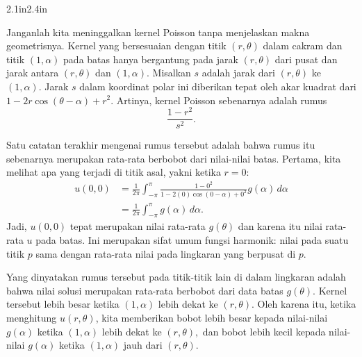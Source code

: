 \begin{mywrapfigsimp}[11]{2.1in}{2.4in}
\diffypdfversion{\vspace*{5pt}}
\noindent
{}
\end{mywrapfigsimp}
Janganlah kita meninggalkan kernel Poisson tanpa menjelaskan makna
geometrisnya.
Kernel yang bersesuaian dengan titik $(r,\theta)$ dalam cakram
dan titik $(1,\alpha)$ pada batas hanya bergantung
pada jarak $(r,\theta)$ dari pusat dan
jarak antara $(r,\theta)$ dan $(1,\alpha)$.
Misalkan $s$ adalah jarak dari $(r,\theta)$ ke
$(1,\alpha)$.
Jarak $s$ dalam koordinat polar ini diberikan tepat oleh akar kuadrat
dari $1 - 2r\cos(\theta-\alpha) +r^2$.  Artinya, kernel Poisson sebenarnya
adalah rumus
\begin{equation*}
\frac{1-r^2}{s^2} .
\end{equation*}

Satu catatan terakhir mengenai rumus tersebut adalah bahwa rumus itu sebenarnya
merupakan rata-rata berbobot dari nilai-nilai batas.
Pertama, kita melihat
apa yang terjadi di titik asal,
yakni ketika $r=0$: %
\begin{equation*}
\begin{split}
u(0,0) &= 
\frac{1}{2\pi} \int_{-\pi}^{\pi}
\frac{1 -0^2}{1 - 2(0)\cos(0-\alpha) +0^2} g(\alpha) \, d\alpha
\\
& =
\frac{1}{2\pi} \int_{-\pi}^{\pi}
g(\alpha) \, d\alpha .
\end{split}
\end{equation*}
Jadi, $u(0,0)$ tepat merupakan nilai rata-rata $g(\theta)$ dan
karena itu nilai rata-rata $u$ pada batas.  Ini
merupakan sifat umum fungsi harmonik: nilai pada suatu titik $p$
sama dengan rata-rata nilai pada lingkaran yang berpusat di $p$.

Yang dinyatakan rumus tersebut pada titik-titik lain di dalam lingkaran
adalah bahwa nilai solusi
merupakan rata-rata berbobot dari data batas $g(\theta)$.  Kernel tersebut
lebih besar ketika $(1,\alpha)$ lebih dekat ke $(r,\theta)$.  Oleh karena itu, ketika
menghitung $u(r,\theta)$, kita
memberikan bobot lebih besar kepada nilai-nilai $g(\alpha)$ ketika $(1,\alpha)$ lebih dekat ke $(r,\theta),$
dan bobot lebih kecil kepada nilai-nilai $g(\alpha)$ ketika $(1,\alpha)$ jauh dari $(r,\theta)$.

